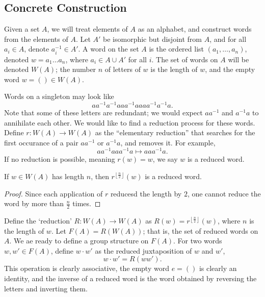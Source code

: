 \subsection{Concrete Construction}
Given a set $A$, we will treat elements of $A$ as an alphabet, and construct words from the elements of $A$. Let $A'$ be isomorphic but disjoint from $A$, and for all $a_i\in A$, denote $a_i^{-1}\in A'$. A word on the set $A$ is the ordered list $(a_1, \dots, a_n )$, denoted $w=a_1 \dots a_n $, where $a_i\in A\cup A'$ for all $i$. The set of words on $A$ will be denoted $W(A)$; the number $n$ of letters of $w$ is the length of $w$, and the empty word $w=\left(  \right) \in W(A)$.

Words on a singleton may look like
\[
	aa^{-1}a^{-1}aaa^{-1}aaaa^{-1}a^{-1}a
.\]
Note that some of these letters are redundant; we would expect $aa^{-1}$ and $a^{-1}a$ to annihilate each other. We would like to find a reduction process for these words. Define $r : W(A) \to W(A)$ as the ``elementary reduction'' that searches for the first occurance of a pair $aa^{-1}$ or $a^{-1}a$, and removes it. For example,
\[
	aa^{-1}aaa^{-1}a \mapsto aaa^{-1}a
.\]
If no reduction is possible, meaning $r(w)=w$, we say $w$ is a reduced word.
\begin{lemma}\label{lma:2.5.1}
	If $w\in W(A)$ has length $n$, then $r^{\left\lfloor \frac{n}{2} \right\rfloor}(w)$ is a reduced word.
\end{lemma}
\begin{proof}
	Since each application of $r$ reducesd the length by $2$, one cannot reduce the word by more than $\frac{n}{2}$ times.
\end{proof}

Define the `reduction' $R : W(A) \to W(A)$ as $R(w)=r^{\left\lfloor \frac{n}{2} \right\rfloor}(w)$, where $n$ is the length of $w$. Let $F(A)=R(W(A))$; that is, the set of reduced words on $A$. We ae ready to define a group structure on $F(A)$. For two words $w,w'\in F(A)$, define $w\cdot w'$ as the reduced juxtaposition of $w$ and $w'$,
\[
	w\cdot w'=R(ww')
.\]
This operation is clearly associative, the empty word $e=\left(  \right) $ is clearly an identity, and the inverse of a reduced word is the word obtained by reversing the letters and inverting them.

